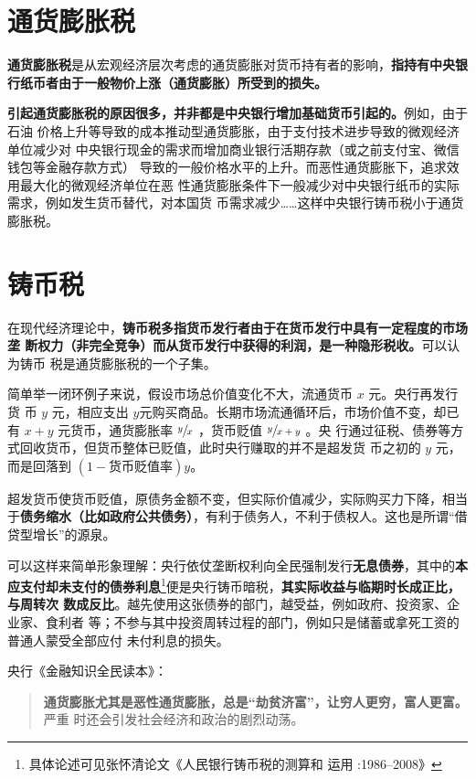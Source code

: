 \section{通货膨胀税}

\textbf{通货膨胀税}是从宏观经济层次考虑的通货膨胀对货币持有者的影响，\textbf{指持有中央银
  行纸币者由于一般物价上涨（通货膨胀）所受到的损失。}

\textbf{引起通货膨胀税的原因很多，并非都是中央银行增加基础货币引起的。}例如，由于石油
价格上升等导致的成本推动型通货膨胀，由于支付技术进步导致的微观经济单位减少对
中央银行现金的需求而增加商业银行活期存款（或之前支付宝、微信钱包等金融存款方式）
导致的一般价格水平的上升。而恶性通货膨胀下，追求效用最大化的微观经济单位在恶
性通货膨胀条件下一般减少对中央银行纸币的实际需求，例如发生货币替代，对本国货
币需求减少……这样中央银行铸币税小于通货膨胀税。

\section{铸币税}

在现代经济理论中，\textbf{铸币税多指货币发行者由于在货币发行中具有一定程度的市场垄
  断权力（非完全竞争）而从货币发行中获得的利润，是一种隐形税收。}可以认为铸币
税是通货膨胀税的一个子集。

简单举一闭环例子来说，假设市场总价值变化不大，流通货币 $x$ 元。央行再发行货
币 $y$ 元，相应支出 $y$元购买商品。长期市场流通循环后，市场价值不变，却已
有 $x+y$ 元货币，通货膨胀率 $ \sfrac{y}{x}$ ，货币贬值 $\sfrac{y}{x+y}$ 。央
行通过征税、债券等方式回收货币，但货币整体已贬值，此时央行赚取的并不是超发货
币之初的 $y$ 元，而是回落到 $(1 - 货币贬值率)y$。

超发货币使货币贬值，原债务金额不变，但实际价值减少，实际购买力下降，相当
于\textbf{债务缩水（比如政府公共债务）}，有利于债务人，不利于债权人。这也是所谓“借
贷型增长”的源泉。

可以这样来简单形象理解：央行依仗垄断权利向全民强制发行\textbf{无息债券}，其中的\textbf{本
  应支付却未支付的债券利息}\footnote{具体论述可见张怀清论文《人民银行铸币税的测算和
  运用 :1986--2008》}便是央行铸币暗税，\textbf{其实际收益与临期时长成正比，与周转次
  数成反比}。越先使用这张债券的部门，越受益，例如政府、投资家、企业家、食利者
等；不参与其中投资周转过程的部门，例如只是储蓄或拿死工资的普通人蒙受全部应付
未付利息的损失。

央行《金融知识全民读本》：
\begin{quotation}
  \textbf{通货膨胀尤其是恶性通货膨胀，总是“劫贫济富”，让穷人更穷，富人更富。}严重
  时还会引发社会经济和政治的剧烈动荡。
\end{quotation}

